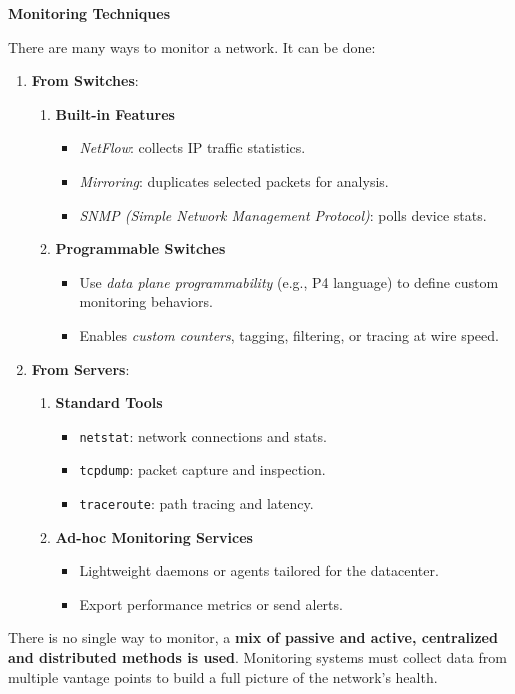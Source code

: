 \highspace
\begin{flushleft}
    \textcolor{Green3}{ \textbf{Monitoring Techniques}}
\end{flushleft}
There are many ways to monitor a network. It can be done:
\begin{enumerate}
    \item \textbf{From Switches}:
    \begin{enumerate}
        \item \textbf{Built-in Features}
        \begin{itemize}
            \item \emph{NetFlow}: collects IP traffic statistics.
            \item \emph{Mirroring}: duplicates selected packets for analysis.
            \item \emph{SNMP (Simple Network Management Protocol)}: polls device stats.
        \end{itemize}
        \item \textbf{Programmable Switches}
        \begin{itemize}
            \item Use \emph{data plane programmability} (e.g., P4 language) to define custom monitoring behaviors.
            \item Enables \emph{custom counters}, tagging, filtering, or tracing at wire speed.
        \end{itemize}
    \end{enumerate}
    
    \item \textbf{From Servers}:
    \begin{enumerate}
        \item \textbf{Standard Tools}
        \begin{itemize}
            \item \texttt{netstat}: network connections and stats.
            \item \texttt{tcpdump}: packet capture and inspection.
            \item \texttt{traceroute}: path tracing and latency.
        \end{itemize}
        \item \textbf{Ad-hoc Monitoring Services}
        \begin{itemize}
            \item Lightweight daemons or agents tailored for the datacenter.
            \item Export performance metrics or send alerts.
        \end{itemize}
    \end{enumerate}
\end{enumerate}
There is no single way to monitor, a \textbf{mix of passive and active, centralized and distributed methods is used}. Monitoring systems must collect data from multiple vantage points to build a full picture of the network's health.

